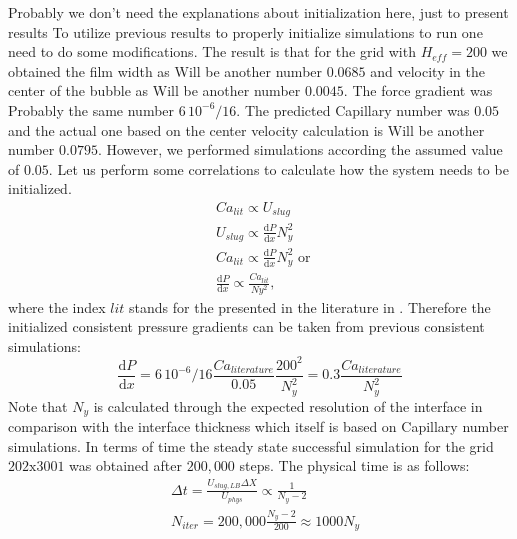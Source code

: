 \documentclass{article}
\begin{document}
{\color{red} Probably we don't need the explanations about initialization here,
just to present results}
To utilize previous results to properly initialize simulations to run one need
to do some modifications. The result is that for the grid with $H_{eff}=200$ we
obtained the film width as {\color{red} Will be another number $0.0685$} and
velocity in the center of the bubble as
{\color{red} Will be another number $0.0045$}. The force gradient was
{\color{red} Probably the same number $6\, 10^{-6} /16$}. The predicted
Capillary
number was $0.05$ and the actual one based on the center velocity calculation is
{\color{red} Will be another number $0.0795$}. However, we performed simulations
according the assumed value of $0.05$. Let us perform some correlations to
calculate how the system needs to be initialized. 
\begin{equation}
\begin{aligned}
&Ca_{lit} \propto U_{slug}\\
&U_{slug} \propto \frac{\mathrm{d}P}{\mathrm{d}x} N_y^2\\ 
&Ca_{lit} \propto \frac{\mathrm{d}P}{\mathrm{d} x} N_y^2 \text{ or }\\
&\frac{\mathrm{d}P}{\mathrm{d} x} \propto \frac{Ca_{lit}}{Ny^2},
\end{aligned}
\end{equation}
where the index $lit$ stands for the presented in the literature in
\cite{giavedoni-numerical,heil-bretherton}. Therefore the initialized consistent
pressure gradients can be taken from
previous consistent simulations:
\begin{equation}
\frac{\mathrm{d}P}{\mathrm{d} x}=6\,10^{-6}/16 \frac{Ca_{literature}}{0.05}
\frac{200^2}{N_y^2}=0.3 \frac{Ca_{literature}}{N_y^2}
\end{equation}
Note that $N_y$ is calculated through the expected resolution of the interface
in comparison with the interface thickness which itself is based on
Capillary number simulations. In terms of time the steady state successful
simulation for the grid $202\mathrm{x}3001$ was obtained after $200,000$ steps.
The physical
time is as follows:
\begin{equation}
\begin{aligned}
&\Delta t=\frac{U_{slug,LB} \Delta X}{U_{phys}} \propto \frac{1}{N_y-2}\\
&N_{iter}=200,000 \frac{N_y-2}{200}\approx 1000 N_y\\
\end{aligned}
\end{equation}
\end{document}
